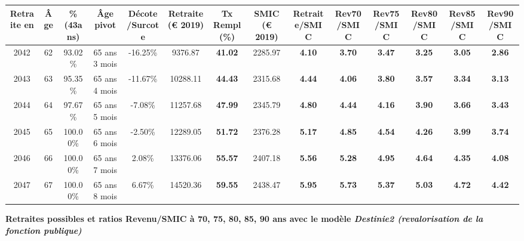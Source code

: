 \begin{adjustbox}{max width=\textwidth} 
\begin{tabular}[htb]{|c|c||c|c|c||c|c||c||c|c|c|c|c|c|} 
\hline 
 Retraite en &  Âge &  \%(43ans) &  Âge pivot &  Décote/Surcote &  Retraite (\euro{} 2019) &  Tx Rempl(\%) &  SMIC (\euro{} 2019) &  Retraite/SMIC &  Rev70/SMIC &  Rev75/SMIC &  Rev80/SMIC &  Rev85/SMIC &  Rev90/SMIC \\ 
\hline \hline 
 2042 &  62 &  93.02\% &  65 ans 3 mois &  -16.25\% &  9376.87 &  {\bf 41.02} &  2285.97 &  {\bf 4.10} &  {\bf 3.70} &  {\bf 3.47} &  {\bf 3.25} &  {\bf 3.05} &  {\bf 2.86} \\ 
\hline 
 2043 &  63 &  95.35\% &  65 ans 4 mois &  -11.67\% &  10288.11 &  {\bf 44.43} &  2315.68 &  {\bf 4.44} &  {\bf 4.06} &  {\bf 3.80} &  {\bf 3.57} &  {\bf 3.34} &  {\bf 3.13} \\ 
\hline 
 2044 &  64 &  97.67\% &  65 ans 5 mois &  -7.08\% &  11257.68 &  {\bf 47.99} &  2345.79 &  {\bf 4.80} &  {\bf 4.44} &  {\bf 4.16} &  {\bf 3.90} &  {\bf 3.66} &  {\bf 3.43} \\ 
\hline 
 2045 &  65 &  100.00\% &  65 ans 6 mois &  -2.50\% &  12289.05 &  {\bf 51.72} &  2376.28 &  {\bf 5.17} &  {\bf 4.85} &  {\bf 4.54} &  {\bf 4.26} &  {\bf 3.99} &  {\bf 3.74} \\ 
\hline 
 2046 &  66 &  100.00\% &  65 ans 7 mois &  2.08\% &  13376.06 &  {\bf 55.57} &  2407.18 &  {\bf 5.56} &  {\bf 5.28} &  {\bf 4.95} &  {\bf 4.64} &  {\bf 4.35} &  {\bf 4.08} \\ 
\hline 
 2047 &  67 &  100.00\% &  65 ans 8 mois &  6.67\% &  14520.36 &  {\bf 59.55} &  2438.47 &  {\bf 5.95} &  {\bf 5.73} &  {\bf 5.37} &  {\bf 5.03} &  {\bf 4.72} &  {\bf 4.42} \\ 
\hline 
\hline 
\end{tabular} 
\end{adjustbox} 
 
 \vspace{0.1cm} 
{\bf \noindent Retraites possibles et ratios Revenu/SMIC à 70, 75, 80, 85, 90 ans avec le modèle \emph{Destinie2 (revalorisation de la fonction publique)}}  
 
